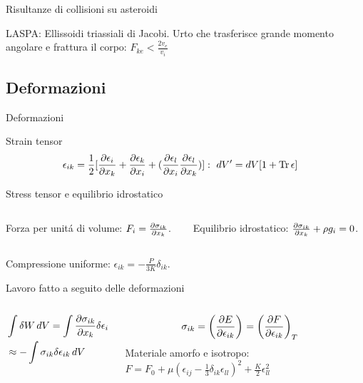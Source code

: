 \begin{wordonframe}{Risultanze di collisioni su asteroidi}
\begin{block}{LASPA: Ellissoidi triassiali di Jacobi.}
Urto che trasferisce grande momento angolare e frattura il corpo: $F_{ke}<\frac{2v_e}{v_i}$
\end{block}
\end{wordonframe}

\subsection{Deformazioni}

\begin{frame}{Deformazioni}
\begin{block}{Strain tensor}
\begin{align*}
&\epsilon_{ik}=\frac{1}{2}[\PDy{x_k}{\epsilon_i}+\PDy{x_i}{\epsilon_k}+(\PDy{x_i}{\epsilon_l}\PDy{x_k}{\epsilon_l})]:\ dV'=dV[1+\Tr{\epsilon}]
\end{align*}
\end{block}
\begin{block}{Stress tensor e equilibrio idrostatico}
\begin{columns}[T]\begin{column}{0.5\textwidth}
Forza per unit\'a di volume: $F_i=\PDy{x_k}{\sigma_{ik}}$.
\end{column} \begin{column}{0.5\textwidth}
Equilibrio idrostatico: $\PDy{x_k}{\sigma_{ik}}+\rho g_i=0$.
\end{column}  \end{columns}
Compressione uniforme: $\epsilon_{ik}=-\frac{P}{3K}\delta_{ik}$.
\end{block}
\begin{block}{Lavoro fatto a seguito delle deformazioni}
\begin{columns}[T]\begin{column}{0.5\textwidth}
\begin{align*}
&\int\delta W\,dV=\int\PDy{x_k}{\sigma_{ik}}\delta\epsilon_i\,dV\\
&\approx-\int\sigma_{ik}\delta\epsilon_{ik}\,dV
\end{align*}
\end{column}\begin{column}{0.5\textwidth}
\begin{align*}
&\sigma_{ik}=\Dcvar{\PDy{\epsilon_{ik}}{E}}{}=\Dcvar{\PDy{\epsilon_{ik}}{F}}{T}
\end{align*}
Materiale amorfo e isotropo:
$F=F_0+\mu(\epsilon_{ij}-\frac{1}{3}\delta_{ik}\epsilon_{ll})^2+\frac{K}{2}\epsilon_{ll}^2$
\end{column}\end{columns}
\end{block}
\end{frame}

